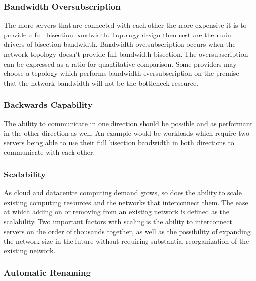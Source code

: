 \documentclass[fullapage,12pt]{article}
\begin{document}
\subsubsection{Bandwidth Oversubscription} \label{ssub:bandwidth-oversubscription}

The more servers that are connected with each other the more expensive it is to provide a full bisection bandwidth. Topology design then cost are the main drivers of bisection bandwidth.  Bandwidth oversubscription occurs when the network topology doesn't provide full bandwidth bisection. The oversubscription can be expressed as a ratio for quantitative comparison. Some providers may choose a topology which performs bandwidth oversubscription on the premise that the network bandwidth will not be the bottleneck resource.


\subsubsection{Backwards Capability} \label{ssub:backwards-capability}

The ability to communicate in one direction should be possible and as performant in the other direction as well. An example would be workloads which require two servers being able to use their full bisection bandwidth in both directions to communicate with each other.


\subsubsection{Scalability} \label{ssub:net-scalability}

As cloud and datacentre computing demand grows, so does the ability to scale existing computing resources and the networks that interconnect them. The ease at which adding on or removing from an existing network is defined as the scalability. Two important factors with scaling is the ability to interconnect servers on the order of thousands together, as well as the possibility of expanding the network size in the future without requiring substantial reorganization of the existing network.


\subsubsection{Automatic Renaming} \label{ssub:auto-renaming}
\end{document}
